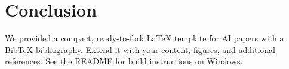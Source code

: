 \section{Conclusion}
We provided a compact, ready-to-fork LaTeX template for AI papers with a Bib\TeX{} bibliography. Extend it with your content, figures, and additional references. See the README for build instructions on Windows.
